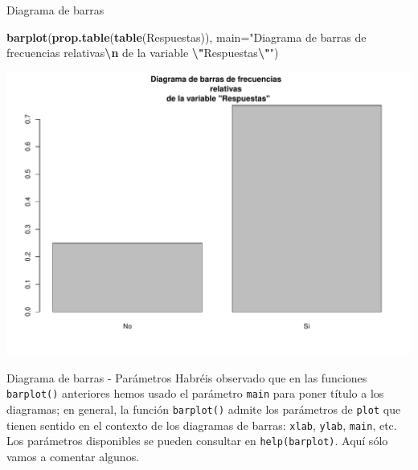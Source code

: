 \documentclass[
  ignorenonframetext,
]{beamer}
\newenvironment{Shaded}{\begin{snugshade}}{\end{snugshade}}
\newcommand{\AttributeTok}[1]{\textcolor[rgb]{0.13,0.29,0.53}{#1}}
\newcommand{\FunctionTok}[1]{\textcolor[rgb]{0.13,0.29,0.53}{\textbf{#1}}}
\newcommand{\NormalTok}[1]{#1}
\newcommand{\SpecialCharTok}[1]{\textcolor[rgb]{0.81,0.36,0.00}{\textbf{#1}}}
\newcommand{\StringTok}[1]{\textcolor[rgb]{0.31,0.60,0.02}{#1}}
\begin{document}
\begin{frame}[fragile]{Diagrama de barras}
\label{diagrama-de-barras-2}
\begin{Shaded}
\begin{Highlighting}[]
\FunctionTok{barplot}\NormalTok{(}\FunctionTok{prop.table}\NormalTok{(}\FunctionTok{table}\NormalTok{(Respuestas)), }\AttributeTok{main=}\StringTok{"Diagrama de barras de frecuencias }
\StringTok{        relativas}\SpecialCharTok{\textbackslash{}n}\StringTok{ de la variable }\SpecialCharTok{\textbackslash{}"}\StringTok{Respuestas}\SpecialCharTok{\textbackslash{}"}\StringTok{"}\NormalTok{)}
\end{Highlighting}
\end{Shaded}

\includegraphics{R_base_files/figure-beamer/unnamed-chunk-86-1.pdf}
\end{frame}

\begin{frame}[fragile]{Diagrama de barras - Parámetros}
\label{diagrama-de-barras---paruxe1metros}
Habréis observado que en las funciones \texttt{barplot()} anteriores
hemos usado el parámetro \texttt{main} para poner título a los
diagramas; en general, la función \texttt{barplot()} admite los
parámetros de \texttt{plot} que tienen sentido en el contexto de los
diagramas de barras: \texttt{xlab}, \texttt{ylab}, \texttt{main}, etc.
Los parámetros disponibles se pueden consultar en
\texttt{help(barplot)}. Aquí sólo vamos a comentar algunos.
\end{frame}
\end{document}
